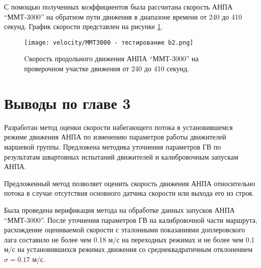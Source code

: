 С помощью полученных коэффициентов была рассчитана скорость АНПА ``ММТ-3000'' на обратном пути движения в диапазоне времени от 240 до 410 секунд.
График скорости представлен на рисунке \ref{fig:mmt3000_velocity_check}.

\begin{figure}[ht]
    \centering
    \texttt{[image: velocity/ММТ3000 - тестирование b2.png]}
    \caption{Cкорость продольного движения АНПА ``ММТ-3000'' на проверочном участке движения от 240 до 410 секунд.}
    \label{fig:mmt3000_velocity_check}
\end{figure}

\section{Выводы по главе 3}
Разработан метод оценки скорости набегающего потока в установившемся режиме движения АНПА по изменению параметров работы движителей маршевой группы.
Предложена методика уточнения параметров ГВ по результатам швартовных испытаний движителей и калибровочным запускам АНПА.

Предложенный метод позволяет оценить скорость движения АНПА относительно потока в случае отсутствия основного датчика скорости или выхода его из строя.

Была проведена верификация метода на обработке данных запусков АНПА ``ММТ-3000''.
После уточнения параметров ГВ на калибровочной части маршрута, расхождение оцениваемой скорости с эталонными показаниями доплеровского лага составило не более чем 0.18 м/с на переходных режимах и не более чем 0.1 м/с на установившихся режимах движения со среднеквадратичным отклонением $\sigma=0.17$ м/с.
